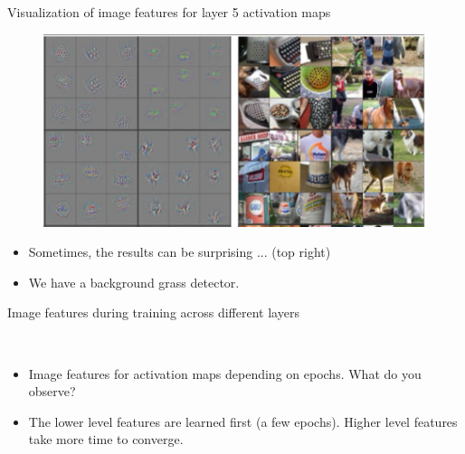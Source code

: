 \documentclass[xcolor=pdftex,dvipsnames,table]{beamer}
\begin{document}
\begin{frame}{Visualization of image features for layer 5 activation maps}
\begin{figure}[htb]
  \centering
  \includegraphics[width=\textwidth]{../graphics/Vis_Layer5_activationmaps_b.png}
\end{figure}
\begin{itemize}
\item <1-> Sometimes, the results can be surprising ... (top right)
\item <2-> We have a background grass detector. 
\end{itemize}
\end{frame}

\begin{frame}{Image features during training across different layers}
\begin{figure}[htb]
  \centering
  \\  
\end{figure}
\begin{itemize}
	\item <1-> Image features for activation maps depending on epochs. What do you observe?
	\item <2-> The lower level features are learned first (a few epochs). Higher level features take more time to converge.
\end{itemize}
\end{frame}
\end{document}
